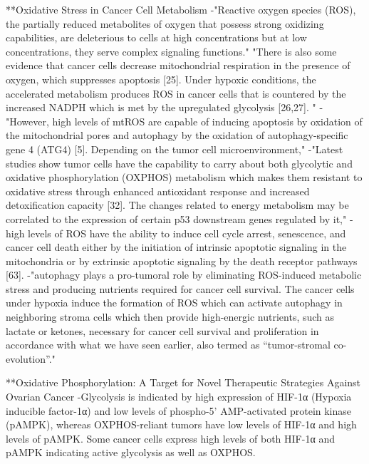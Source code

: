 \documentclass[11pt,a4paper]{article}
\begin{document}
**Oxidative Stress in Cancer Cell Metabolism
-"Reactive oxygen species (ROS), the partially reduced metabolites of oxygen that possess strong oxidizing capabilities, are deleterious to cells at high concentrations but at low concentrations, they serve complex signaling functions."
"There is also some evidence that cancer cells decrease mitochondrial respiration in the presence of oxygen, which suppresses apoptosis [25]. Under hypoxic conditions, the accelerated metabolism produces ROS in cancer cells that is countered by the increased NADPH which is met by the upregulated glycolysis [26,27]. "
-"However, high levels of mtROS are capable of inducing apoptosis by oxidation of the mitochondrial pores and autophagy by the oxidation of autophagy-specific gene 4 (ATG4) [5]. Depending on the tumor cell microenvironment,"
-"Latest studies show tumor cells have the capability to carry about both glycolytic and oxidative phosphorylation (OXPHOS) metabolism which makes them resistant to oxidative stress through enhanced antioxidant response and increased detoxification capacity [32]. The changes related to energy metabolism may be correlated to the expression of certain p53 downstream genes regulated by it,"
- high levels of ROS have the ability to induce cell cycle arrest, senescence, and cancer cell death either by the initiation of intrinsic apoptotic signaling in the mitochondria or by extrinsic apoptotic signaling by the death receptor pathways [63].
-"autophagy plays a pro-tumoral role by eliminating ROS-induced metabolic stress and producing nutrients required for cancer cell survival. The cancer cells under hypoxia induce the formation of ROS which can activate autophagy in neighboring stroma cells which then provide high-energic nutrients, such as lactate or ketones, necessary for cancer cell survival and proliferation in accordance with what we have seen earlier, also termed as “tumor-stromal co-evolution”."

**Oxidative Phosphorylation: A Target for Novel Therapeutic Strategies Against Ovarian Cancer
-Glycolysis is indicated by high expression of HIF-1α (Hypoxia inducible factor-1α) and low levels of phospho-5’ AMP-activated protein kinase (pAMPK), whereas OXPHOS-reliant tumors have low levels of HIF-1α and high levels of pAMPK. Some cancer cells express high levels of both HIF-1α and pAMPK indicating active glycolysis as well as OXPHOS. 
\end{document}
